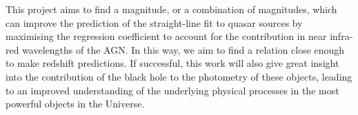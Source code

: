 \documentclass[11pt,a4paper]{report}
\begin{document}
	This project aims to find a magnitude, or a combination of magnitudes, which
	can improve the prediction of the straight-line fit to quasar sources by
	maximising the regression coefficient to account for the contribution in near
	infra-red wavelengths of the AGN. In this way, we aim to find a relation close
	enough to make redshift predictions. If successful, this work will also give
	great insight into the contribution of the black hole to the photometry of these
	objects, leading to an improved understanding of the underlying physical
	processes in the most powerful objects in the Universe.
	
	
	
	

	
\end{document}
